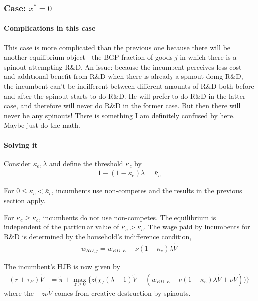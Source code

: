 \documentclass[12pt,english]{article}
\theoremstyle{remark}
\begin{document}
\subsubsection{Case: $x^* = 0$}

\paragraph{Complications in this case}

This case is more complicated than the previous one because there will be another equilibrium object - the BGP fraction of goods $j$ in which there is a spinout attempting R\&D. An issue: because the incumbent perceives less cost and additional benefit from R\&D when there is already a spinout doing R\&D, the incumbent can't be indifferent between different amounts of R\&D both before and after the spinout starts to do R\&D. He will prefer to do R\&D in the latter case, and therefore will never do R\&D in the former case. But then there will never be any spinouts! There is something I am definitely confused by here. Maybe just do the math.

\paragraph{Solving it}

Consider $\kappa_{e}, \lambda$ and define the threshold $\bar{\kappa}_c$ by 
\begin{align}
	1-(1-\kappa_{e})\lambda= \bar{\kappa}_c \label{eq_nca_threshold}
\end{align}

For $0 \le \kappa_{c} < \bar{\kappa}_c$, incumbents use non-competes and the results in the previous section apply.

For $\kappa_{c} \ge \bar{\kappa}_c$, incumbents do not use non-competes. The equilibrium is independent of the particular value of $\kappa_{c} > \bar{\kappa}_c$. The wage paid by incumbents for R\&D is determined by the household's indifference condition,
\begin{align}
	w_{RD,j} = w_{RD,E}- \nu (1-\kappa_{e}) \lambda \tilde{V} \label{eq:wage_rd}
\end{align}

The incumbent's HJB is now given by 
\begin{align}
	(r + \tau_E) \tilde{V} &= \tilde{\pi} + \max_{z \ge 0 } \Big\{ z \Big( \chi_I (\lambda - 1) \tilde{V} - (w_{RD,E} - \nu (1-\kappa_{e}) \lambda \tilde{V} + \nu \tilde{V} )\Big)  \Big\}\label{eq:hjb_incumbent_noNCA}
\end{align}
where the $-z \nu \tilde{V}$ comes from creative destruction by spinouts.
\end{document}
